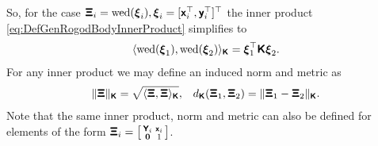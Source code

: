 So, for the case $\protoXi_i = \wedOp(\protoxi_i), \protoxi_i = [\protox_i^\top, \protoy_i^\top]^\top$ the inner product \eqref{eq:DefGenRogodBodyInnerProduct} simplifies to
\begin{align}
 \sProd[\protoK]{\wedOp(\protoxi_1)}{\wedOp(\protoxi_2)} = \protoxi_1^\top \protoK \protoxi_2.
\end{align}
For any inner product we may define an induced norm and metric as
\begin{align}
 \norm[\protoK]{\protoXi} &= \sqrt{\sProd[\protoK]{\protoXi}{\protoXi}},&
 d_{\protoK} (\protoXi_1, \protoXi_2) = \norm[\protoK]{\protoXi_1 - \protoXi_2}.
\end{align}
Note that the same inner product, norm and metric can also be defined for elements of the form $\protoXi_i = \left[\begin{smallmatrix} \protoY_i & \protox_i \\ \mat{0} & 1 \end{smallmatrix}\right]$.

